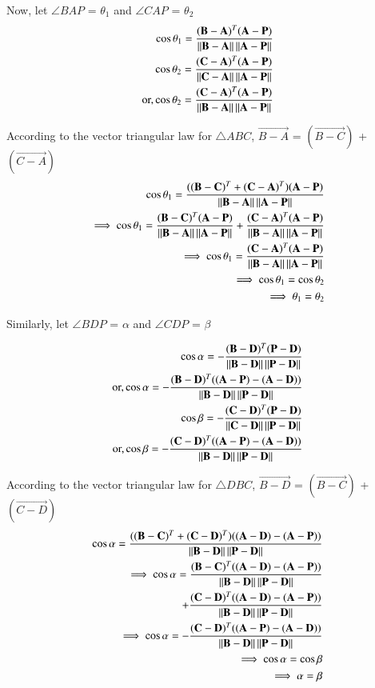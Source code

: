 \documentclass[journal,12pt,twocolumn]{IEEEtran}
\begin{document}
Now, let $\angle BAP$ = $\theta_1$ and $\angle CAP$ = $\theta_2$
\begin{align}
\cos\theta_1 = \frac{(\mathbf{B-A})^T (\mathbf{A-P})}{\left\lVert\mathbf{B-A}\right\rVert\left\lVert\mathbf{A-P}\right\rVert}\\
\cos\theta_2 = \frac{(\mathbf{C-A})^T (\mathbf{A-P})}{\left\lVert\mathbf{C-A}\right\rVert\left\lVert\mathbf{A-P}\right\rVert}\\
\text{or,}\cos\theta_2 = \frac{(\mathbf{C-A})^T (\mathbf{A-P})}{\left\lVert\mathbf{B-A}\right\rVert\left\lVert\mathbf{A-P}\right\rVert}\\
\end{align}

According to the vector triangular law for $\triangle ABC$, $\vec{B-A}$ = $(\vec{B-C})$ + $(\vec{C-A})$
\begin{align}
\cos\theta_1 = \frac{((\mathbf{B-C})^T + (\mathbf{C-A})^T)(\mathbf{A-P})}{\left\lVert\mathbf{B-A}\right\rVert\left\lVert\mathbf{A-P}\right\rVert}\\
\implies \cos\theta_1 = \frac{(\mathbf{B-C})^T (\mathbf{A-P})}{\left\lVert\mathbf{B-A}\right\rVert\left\lVert\mathbf{A-P}\right\rVert} + \frac{(\mathbf{C-A})^T (\mathbf{A-P})}{\left\lVert\mathbf{B-A}\right\rVert\left\lVert\mathbf{A-P}\right\rVert}\\
\implies \cos\theta_1 = \frac{(\mathbf{C-A})^T (\mathbf{A-P})}{\left\lVert\mathbf{B-A}\right\rVert\left\lVert\mathbf{A-P}\right\rVert}\\
\implies \cos\theta_1 = \cos\theta_2\\
\implies \theta_1 = \theta_2
\end{align}

Similarly, let $\angle BDP$ = $\alpha$ and $\angle CDP$ = $\beta$

\begin{align}
\cos\alpha = -\frac{(\mathbf{B-D})^T (\mathbf{P-D})}{\left\lVert\mathbf{B-D}\right\rVert\left\lVert\mathbf{P-D}\right\rVert}\\
\text{or,} \cos\alpha = -\frac{(\mathbf{B-D})^T ((\mathbf{A-P})-(\mathbf{A-D}))}{\left\lVert\mathbf{B-D}\right\rVert\left\lVert\mathbf{P-D}\right\rVert}\\
\cos\beta = - \frac{(\mathbf{C-D})^T (\mathbf{P-D})}{\left\lVert\mathbf{C-D}\right\rVert\left\lVert\mathbf{P-D}\right\rVert}\\
\text{or,}\cos\beta = - \frac{(\mathbf{C-D})^T ((\mathbf{A-P})-(\mathbf{A-D}))}{\left\lVert\mathbf{B-D}\right\rVert\left\lVert\mathbf{P-D}\right\rVert}
\end{align}

According to the vector triangular law for $\triangle DBC$, $\vec{B-D}$ = $(\vec{B-C})$ + $(\vec{C-D})$
\begin{align}
\cos\alpha = \frac{((\mathbf{B-C})^T + (\mathbf{C-D})^T)((\mathbf{A-D})-(\mathbf{A-P}))}{\left\lVert\mathbf{B-D}\right\rVert\left\lVert\mathbf{P-D}\right\rVert}\\
\implies \cos\alpha = \frac{(\mathbf{B-C})^T ((\mathbf{A-D})-(\mathbf{A-P}))}{\left\lVert\mathbf{B-D}\right\rVert\left\lVert\mathbf{P-D}\right\rVert} \\
+ \frac{(\mathbf{C-D})^T ((\mathbf{A-D})-(\mathbf{A-P}))}{\left\lVert\mathbf{B-D}\right\rVert\left\lVert\mathbf{P-D}\right\rVert}\\
\implies \cos\alpha = - \frac{(\mathbf{C-D})^T ((\mathbf{A-P})-(\mathbf{A-D}))}{\left\lVert\mathbf{B-D}\right\rVert\left\lVert\mathbf{P-D}\right\rVert}\\
\implies \cos\alpha = \cos\beta\\
\implies \alpha = \beta
\end{align}
\end{document}
